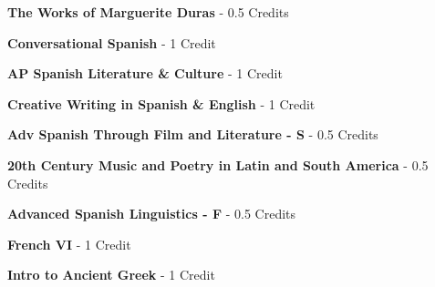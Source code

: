 \noindent\textbf{The Works of Marguerite Duras}  - 0.5 Credits

\vspace{3mm}
\noindent\textbf{Conversational Spanish}  - 1 Credit

\vspace{3mm}
\noindent\textbf{AP Spanish Literature \& Culture}  - 1 Credit

\vspace{3mm}
\noindent\textbf{Creative Writing in Spanish \& English}  - 1 Credit

\vspace{3mm}
\noindent\textbf{Adv Spanish Through Film and Literature - S}  - 0.5 Credits

\vspace{3mm}
\noindent\textbf{20th Century Music and Poetry in Latin and South America}  - 0.5 Credits

\vspace{3mm}
\noindent\textbf{Advanced Spanish Linguistics - F}  - 0.5 Credits

\vspace{3mm}
\noindent\textbf{French VI}  - 1 Credit

\vspace{3mm}
\noindent\textbf{Intro to Ancient Greek}  - 1 Credit

\vspace{3mm}
